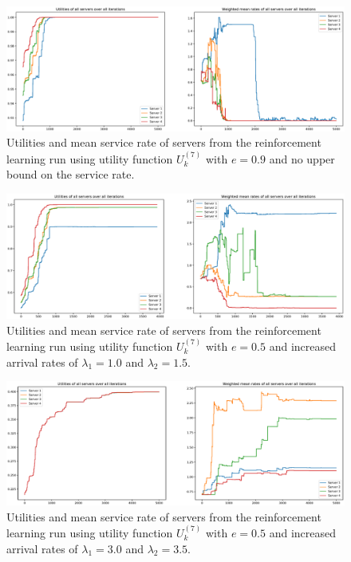 \begin{figure}[H]
    \includegraphics[width=\textwidth]{chapters/00_appendix/03_more_rl_results/Bin/utility_7_eps/u7_5_no_max_e09.eps}
    \caption{Utilities and mean service rate of servers from the reinforcement
    learning run using utility function \(U_k^{(7)}\) with \(e = 0.9\) and no
    upper bound on the service rate.}
    \label{fig:RL_utility7_5_no_max_e09}
\end{figure}


\begin{figure}[H]
    \includegraphics[width=\textwidth]{chapters/00_appendix/03_more_rl_results/Bin/utility_7_eps/u7_6_e05_Lambda_25.eps}
    \caption{Utilities and mean service rate of servers from the reinforcement
    learning run using utility function \(U_k^{(7)}\) with \(e = 0.5\) and
    increased arrival rates of \(\lambda_1 = 1.0\) and \(\lambda_2 = 1.5\).}
    \label{fig:RL_utility7_6_e05_Lambda_25}
\end{figure}

\begin{figure}[H]
    \includegraphics[width=\textwidth]{chapters/00_appendix/03_more_rl_results/Bin/utility_7_eps/u7_6_e05_Lambda_65.eps}
    \caption{Utilities and mean service rate of servers from the reinforcement
    learning run using utility function \(U_k^{(7)}\) with \(e = 0.5\) and
    increased arrival rates of \(\lambda_1 = 3.0\) and \(\lambda_2 = 3.5\).}
    \label{fig:RL_utility7_6_e05_Lambda_65}
\end{figure}

